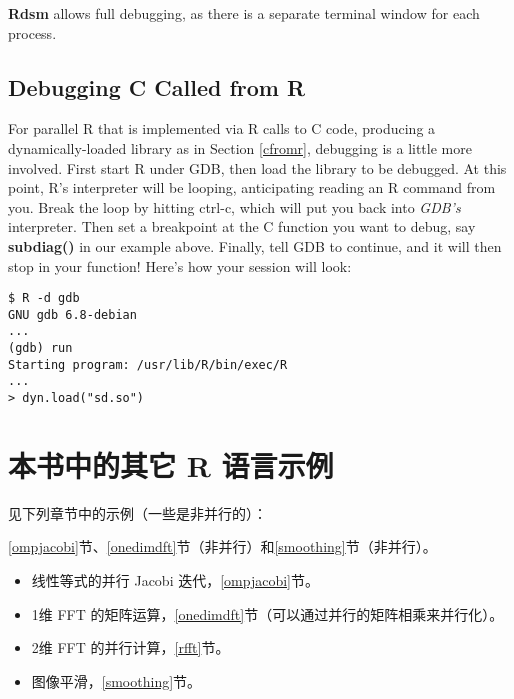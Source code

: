 {\bf Rdsm} allows full debugging, as there is a separate terminal window
for each process.

\subsection{Debugging C Called from R}

For parallel R that is implemented via R calls to C code, producing a
dynamically-loaded library as in Section \ref{cfromr}, debugging is a
little more involved.  First start R under GDB, then load the library to
be debugged.  At this point, R's interpreter will be looping,
anticipating reading an R command from you.  Break the loop by hitting
ctrl-c, which will put you back into {\it GDB's} interpreter.  Then set
a breakpoint at the C function you want to debug, say {\bf subdiag()} in
our example above.  Finally, tell GDB to continue, and it will then stop
in your function!  Here's how your session will look:

\begin{lstlisting}
$ R -d gdb
GNU gdb 6.8-debian
...
(gdb) run
Starting program: /usr/lib/R/bin/exec/R
...
> dyn.load("sd.so")
\end{lstlisting}

\section{本书中的其它 R 语言示例}

见下列章节中的示例（一些是非并行的）：

\ref{ompjacobi}节、\ref{onedimdft}节（非并行）和\ref{smoothing}节（非并行）。

\begin{itemize}

\item 线性等式的并行 Jacobi 迭代，\ref{ompjacobi}节。

\item 1维 FFT 的矩阵运算，\ref{onedimdft}节（可以通过并行的矩阵相乘来并行化）。

\item 2维 FFT 的并行计算，\ref{rfft}节。

\item 图像平滑，\ref{smoothing}节。

\end{itemize}



